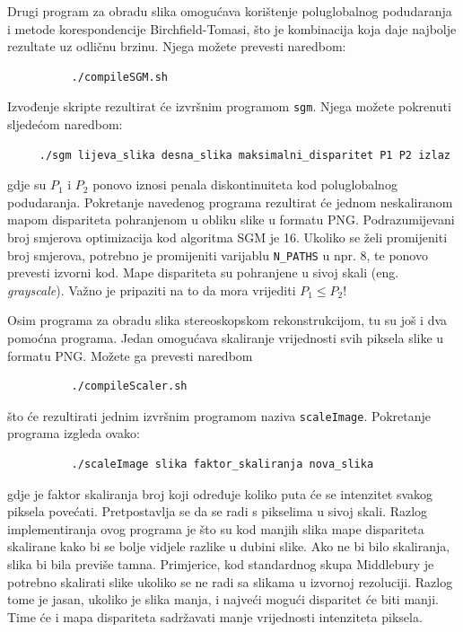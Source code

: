 \documentclass[utf8, zavrsni, numeric]{fer}
\begin{document}
Drugi program za obradu slika omogućava korištenje poluglobalnog podudaranja i metode korespondencije Birchfield-Tomasi, što je kombinacija koja daje najbolje rezultate uz odličnu brzinu.
Njega možete prevesti naredbom:
\begin{verbatim}
          ./compileSGM.sh
\end{verbatim}

Izvođenje skripte rezultirat će izvršnim programom {\tt sgm}. Njega možete pokrenuti sljedećom naredbom:
\begin{verbatim}
     ./sgm lijeva_slika desna_slika maksimalni_disparitet P1 P2 izlaz
\end{verbatim}
gdje su $P_1$ i $P_2$ ponovo iznosi penala diskontinuiteta kod poluglobalnog podudaranja.
Pokretanje navedenog programa rezultirat će jednom neskaliranom mapom dispariteta pohranjenom
u obliku slike u formatu PNG.
Podrazumijevani broj smjerova optimizacija kod algoritma SGM je 16. Ukoliko se želi promijeniti
broj smjerova, potrebno je promijeniti varijablu {\verb|N_PATHS|} u npr. 8, te ponovo prevesti izvorni kod. Mape dispariteta su pohranjene u sivoj skali (eng. {\sl grayscale}).
Važno je pripaziti na to da mora vrijediti $P_1 \leq P_2$\/!

Osim programa za obradu slika stereoskopskom rekonstrukcijom, tu su još i dva pomoćna programa. Jedan omogućava skaliranje vrijednosti svih piksela slike u formatu PNG. Možete ga prevesti
naredbom
\begin{verbatim}
          ./compileScaler.sh
\end{verbatim}
što će rezultirati jednim izvršnim programom naziva {\tt scaleImage}. Pokretanje programa
izgleda ovako:
\begin{verbatim}
          ./scaleImage slika faktor_skaliranja nova_slika
\end{verbatim}
gdje je faktor skaliranja broj koji određuje koliko puta će se intenzitet svakog piksela povećati. Pretpostavlja se da se radi s pikselima u sivoj skali. Razlog implementiranja ovog programa
je što su kod manjih slika mape dispariteta skalirane kako bi se bolje vidjele razlike u dubini slike. Ako ne bi bilo skaliranja, slika bi bila previše tamna. Primjerice, kod standardnog skupa Middlebury je potrebno skalirati slike ukoliko se ne radi sa slikama u izvornoj rezoluciji. Razlog tome je jasan, ukoliko je slika manja, i najveći mogući disparitet će biti manji.
Time će i mapa dispariteta sadržavati manje vrijednosti intenziteta piksela.
\end{document}
